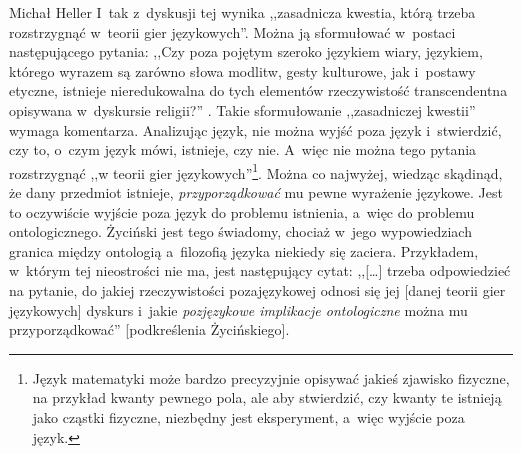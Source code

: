 \begin{artplenv}{Michał Heller}
I~tak z~dyskusji tej wynika ,,zasadnicza kwestia, którą trzeba rozstrzygnąć w~teorii gier językowych''. Można ją sformułować w~postaci następującego pytania: ,,Czy poza pojętym szeroko językiem wiary, językiem, którego wyrazem są zarówno słowa modlitw, gesty kulturowe, jak i~postawy etyczne, istnieje nieredukowalna do tych elementów rzeczywistość transcendentna opisywana w~dyskursie religii?''
\parencite[][s.~16]{zycinski_teizm_1985}. %
 Takie sformułowanie ,,zasadniczej kwestii'' wymaga komentarza. Analizując język, nie można wyjść poza język i~stwierdzić, czy to, o~czym język mówi, istnieje, czy nie. A~więc nie można tego pytania rozstrzygnąć ,,w teorii gier językowych''\footnote{Język matematyki może bardzo precyzyjnie opisywać jakieś zjawisko fizyczne, na przykład kwanty pewnego pola, ale aby stwierdzić, czy kwanty te istnieją jako cząstki fizyczne, niezbędny jest eksperyment, a~więc wyjście poza język.}. Można co najwyżej, wiedząc skądinąd, że dany przedmiot istnieje, \textit{przyporządkować} mu pewne wyrażenie językowe. Jest to oczywiście wyjście poza język do problemu istnienia, a~więc do problemu ontologicznego. Życiński jest tego świadomy, chociaż w~jego wypowiedziach granica między ontologią a~filozofią języka niekiedy się zaciera. Przykładem, w~którym tej nieostrości nie ma, jest następujący cytat: ,,[\ldots] trzeba odpowiedzieć na pytanie, do jakiej rzeczywistości pozajęzykowej odnosi się jej [danej teorii gier językowych] dyskurs i~jakie \textit{pozjęzykowe implikacje ontologiczne} można mu przyporządkować'' 
\parencite[][s.~18]{zycinski_teizm_1985}%
[podkreślenia Życińskiego].


\end{artplenv}
